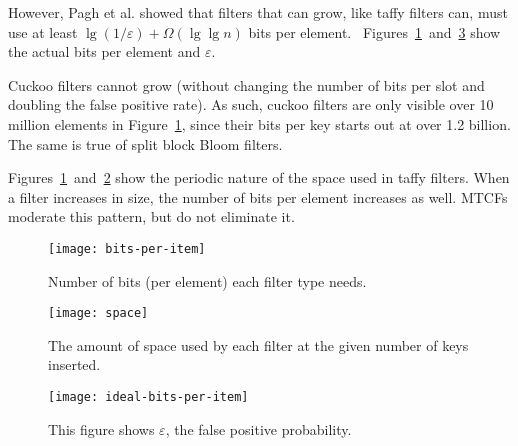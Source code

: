\documentclass[letterpaper,twocolumn,10pt]{article}
\newcommand{\etal}{et al.}
\begin{document}
However, Pagh \etal{} showed that filters that can grow, like taffy filters can, must use at least $\lg (1/\varepsilon) + \Omega(\lg \lg n)$ bits per element.~\cite{psw}
Figures~\ref{bits-per-item}~and~\ref{ideal-bits-per-item} show the actual bits per element and $\varepsilon$.

Cuckoo filters cannot grow (without changing the number of bits per slot and doubling the false positive rate).
As such, cuckoo filters are only visible over 10 million elements in Figure~\ref{bits-per-item}, since their bits per key starts out at over 1.2 billion.
The same is true of split block Bloom filters.

Figures~\ref{bits-per-item}~and~\ref{space-steps} show the periodic nature of the space used in taffy filters.
When a filter increases in size, the number of bits per element increases as well.
MTCFs moderate this pattern, but do not eliminate it.








\begin{figure}

  \texttt{[image: bits-per-item]}
  \caption{  \label{bits-per-item}
Number of bits (per element) each filter type needs.}
\end{figure}

\begin{figure}
  \texttt{[image: space]}
  \caption{
    \label{space-steps}
    The amount of space used by each filter at the given number of keys inserted.
  }
\end{figure}

\begin{figure}
  \texttt{[image: ideal-bits-per-item]}
  \caption{  \label{ideal-bits-per-item}
    This figure shows $\varepsilon$, the false positive probability.
  }
\end{figure}


\end{document}
